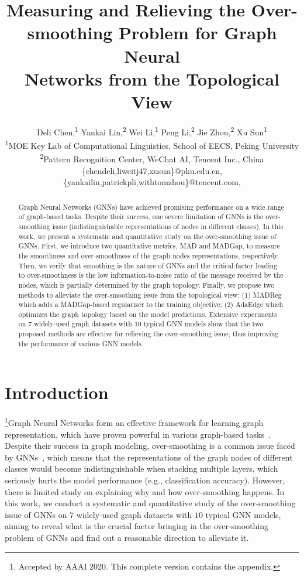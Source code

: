 \documentclass[letterpaper]{article} \usepackage{aaai20}  \usepackage{times}  \usepackage{helvet} \usepackage{courier}  \usepackage[hyphens]{url}  \usepackage{graphicx} \urlstyle{rm} \def\UrlFont{\rm}  \frenchspacing  \setlength{\pdfpagewidth}{8.5in}  \setlength{\pdfpageheight}{11in}  \setcounter{secnumdepth}{0}
\title{Measuring and Relieving the Over-smoothing Problem for Graph Neural \\ Networks from the Topological View}
\author{Deli Chen,\textsuperscript{\rm 1}
Yankai Lin,\textsuperscript{\rm 2}
Wei Li,\textsuperscript{\rm 1}
Peng Li,\textsuperscript{\rm 2}
Jie Zhou,\textsuperscript{\rm 2}
Xu Sun\textsuperscript{\rm 1}
\\ 
\textsuperscript{\rm 1}{MOE Key Lab of Computational Linguistics, School of EECS, Peking University}\\
\textsuperscript{\rm 2}{Pattern Recognition Center, WeChat AI, Tencent Inc., China}\\
\{chendeli,liweitj47,xusun\}@pku.edu.cn,
\{yankailin,patrickpli,withtomzhou\}@tencent.com, 
}
\newcommand{\citep}{\cite}
\begin{document}
\maketitle
\begin{abstract}
Graph Neural Networks (GNNs) have achieved promising performance on a wide range of graph-based tasks. Despite their success, one severe limitation of GNNs is the over-smoothing issue (indistinguishable representations of nodes in different classes). In this work, we present a systematic and quantitative study on the over-smoothing issue of GNNs. 
First, we introduce two quantitative metrics, MAD and MADGap, to measure the smoothness and over-smoothness of the graph nodes representations, respectively.
Then, we verify that smoothing is the nature of GNNs and the critical factor leading to over-smoothness is the low information-to-noise ratio of the message received by the nodes, which is partially determined by the graph topology.
Finally, we propose two methods to alleviate the over-smoothing issue from the topological view: 
(1) MADReg which adds a MADGap-based regularizer to the training objective;
(2) AdaEdge which optimizes the graph topology based on the model predictions.
Extensive experiments on $7$ widely-used graph datasets with $10$ typical GNN models show that the two proposed methods are effective for relieving the over-smoothing issue, thus improving the performance of various GNN models. 
\end{abstract}

\section{Introduction}
\footnote{Accepted by AAAI 2020. This complete version contains the appendix.}Graph Neural Networks form an effective framework for learning graph representation, which have proven powerful in various graph-based tasks~\citep{dataset_ccp,model_gat,dataset_ppi}. Despite their success in graph modeling, over-smoothing is a common issue faced by GNNs~\citep{analysis_smoothing,survey_gnn}, which means that the representations of the graph nodes of different classes would become indistinguishable when stacking multiple layers, which seriously hurts the model performance (e.g., classification accuracy). However, there is limited study on explaining why and how over-smoothing happens.
In this work, we conduct a systematic and quantitative study of the over-smoothing issue of GNNs on $7$ widely-used graph datasets with $10$ typical GNN models, aiming to reveal what is the crucial factor bringing in the over-smoothing problem of GNNs and find out a reasonable direction to alleviate it. 
\end{document}
